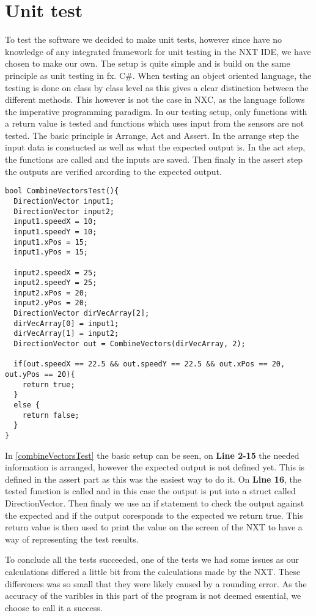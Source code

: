 \chapter{Unit test}

To test the \name software we decided to make unit tests, however since have no
knowledge of any integrated framework for unit testing in the NXT IDE, we
have chosen to make our own. The setup is quite simple and is build on the same
principle as unit testing in fx. C\#. When testing an object oriented
language, the testing is done on class by class level as this gives a clear
distinction between the different methods. This however is not the case in NXC,
as the language follows the imperative programming paradigm. In our testing
setup, only functions with a return value is tested and functions which uses
input from the sensors are not tested. The basic principle is Arrange, Act and
Assert. In the arrange step the input data is constucted as well as what the
expected output is. In the act step, the functions are called and the inputs are
saved. Then finaly in the assert step the outputs are verified arcording to the
expected output. \nl

\begin{minipage}[H]{\linewidth}
\begin{lstlisting}[caption =Unit Test for Combine Vectors,label=combineVectorsTest] 
bool CombineVectorsTest(){
  DirectionVector input1;
  DirectionVector input2;
  input1.speedX = 10;
  input1.speedY = 10;
  input1.xPos = 15;
  input1.yPos = 15;
  
  input2.speedX = 25;
  input2.speedY = 25;
  input2.xPos = 20;
  input2.yPos = 20;
  DirectionVector dirVecArray[2];
  dirVecArray[0] = input1;
  dirVecArray[1] = input2;
  DirectionVector out = CombineVectors(dirVecArray, 2);
  
  if(out.speedX == 22.5 && out.speedY == 22.5 && out.xPos == 20, out.yPos == 20){
    return true;
  }
  else {
    return false;
  }
}
\end{lstlisting}
\end{minipage}

In \autoref{combineVectorsTest} the basic setup can be seen, on \textbf{Line
2-15} the needed information is arranged, however the expected output is not
defined yet. This is defined in the assert part as this was the easiest way to
do it. On \textbf{Line 16}, the tested function is called and in this case the
output is put into a struct called DirectionVector. Then finaly we use an if
statement to check the output against the expected and if the output coresponds
to the expected we return true. This return value is then used to print the
value on the screen of the NXT to have a way of representing the test results.
\nl

To conclude all the tests succeeded, one of the tests we had some issues as our
calculations differed a little bit from the calculations made by the NXT. These
differences was so small that they were likely caused by a rounding error. As
the accuracy of the varibles in this part of the program is not deemed
essential, we choose to call it a success.
